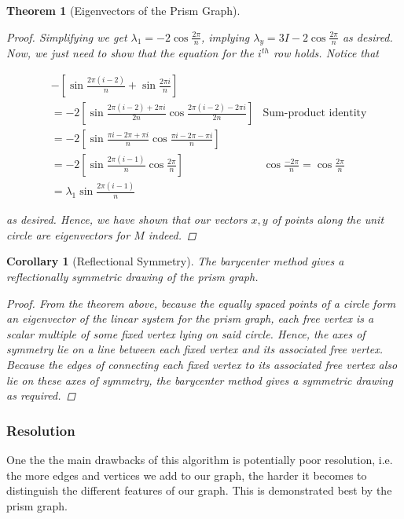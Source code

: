 \documentclass[11pt]{report}
\newtheorem{theorem}{Theorem}[section]
\newtheorem{corollary}{Corollary}[section]
\begin{document}
\begin{theorem}[Eigenvectors of the Prism Graph]
\begin{proof}
        Simplifying we get $\lambda_1 = -2\cos{\frac{2\pi}{n}}$, implying $\lambda_y = 3I - 2\cos{\frac{2\pi}{n}}$ as desired. Now, we just need to show that the equation for the $i^{th}$ row holds. Notice that
        
        \[
        \begin{aligned}
        &-\left[\sin{\frac{2 \pi (i - 2)}{n}} + \sin{\frac{2 \pi i}{n}}\right] \\
        &= -2\left[
        \sin{ \frac{2\pi(i - 2) + 2\pi i}{2n} }
        \cos{ \frac{2\pi(i - 2) - 2\pi i}{2n} }
        \right]
        &\text{Sum-product identity} \\
        &= -2\left[
        \sin{ \frac{\pi i - 2\pi + \pi i}{n} }
        \cos{ \frac{\pi i - 2\pi - \pi i}{n} }
        \right] \\
        &= -2\left[
        \sin{ \frac{2\pi(i - 1)}{n} }
        \cos{ \frac{2\pi}{n} }
        \right]
        &\cos{ \frac{-2\pi}{n} } = \cos{ \frac{2\pi}{n} } \\
        &= \lambda_1 \sin{ \frac{2\pi(i - 1)}{n} }
        \end{aligned}
        \]
        
        as desired. Hence, we have shown that our vectors $x, y$ of points along the unit circle are eigenvectors for $M$ indeed.
    \end{proof}
\end{theorem}

\begin{corollary}[Reflectional Symmetry]
    The barycenter method gives a reflectionally symmetric drawing of the prism graph.
    
    \begin{proof}
        From the theorem above, because the equally spaced points of a circle form an eigenvector of the linear system for the prism graph, each free vertex is a scalar multiple of some fixed vertex lying on said circle. Hence, the axes of symmetry lie on a line between each fixed vertex and its associated free vertex. Because the edges of connecting each fixed vertex to its associated free vertex also lie on these axes of symmetry, the barycenter method gives a symmetric drawing as required.
    \end{proof}
\end{corollary}

\subsubsection{Resolution}
One the the main drawbacks of this algorithm is potentially poor resolution, i.e. the more edges and vertices we add to our graph, the harder it becomes to distinguish the different features of our graph. This is demonstrated best by the prism graph.
\end{document}
